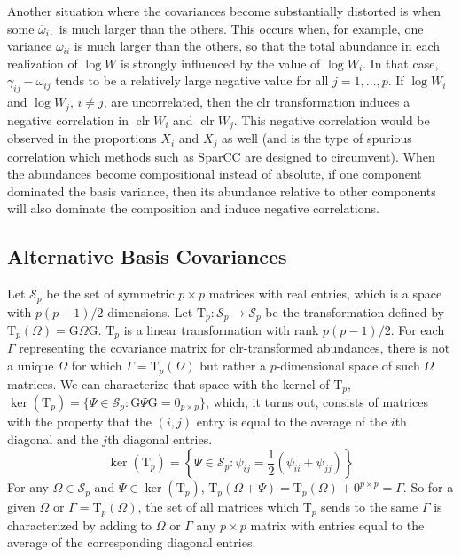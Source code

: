 \documentclass[10pt]{article}
\newcommand{\clr}{\operatorname{clr}}
\begin{document}
Another situation where the covariances become substantially distorted is when some $\overline{\omega}_{i\cdot}$ is much larger than the others. This occurs when, for example, one variance $\omega_{ii}$ is much larger than the others, so that the total abundance in each realization of $\log W$ is strongly influenced by the value of $\log W_i$. In that case, $\gamma_{ij} - \omega_{ij}$ tends to be a relatively large negative value for all $j = 1, \dots, p$. If $\log W_i$ and $\log W_j$, $i \ne j$, are uncorrelated, then the clr transformation induces a negative correlation in $\clr W_i$ and $\clr W_j$. This negative correlation would be observed in the proportions $X_i$ and $X_j$ as well (and is the type of spurious correlation which methods such as SparCC are designed to circumvent). When the abundances become compositional instead of absolute, if one component dominated the basis variance, then its abundance relative to other components will also dominate the composition and induce negative correlations.

\subsection*{Alternative Basis Covariances}

Let $\mathcal{S}_p$ be the set of symmetric $p \times p$ matrices with real entries, which is a space with $p(p+1)/2$ dimensions. Let $\mathrm{T}_p: \mathcal{S}_p \rightarrow \mathcal{S}_p$ be the transformation defined by $\mathrm{T}_p(\Omega) = \mathrm{G} \Omega \mathrm{G}$. $\mathrm{T}_p$ is a linear transformation with rank $p(p-1)/2$. For each $\Gamma$ representing the covariance matrix for clr-transformed abundances, there is not a unique $\Omega$ for which $\Gamma = \mathrm{T}_p(\Omega)$ but rather a $p$-dimensional space of such $\Omega$ matrices. We can characterize that space with the kernel of $\mathrm{T}_p$, $\ker(\mathrm{T}_p) = \{\Psi \in \mathcal{S}_p: \mathrm{G} \Psi \mathrm{G} = 0_{p \times p}\}$, which, it turns out, consists of matrices with the property that the $(i,j)$ entry is equal to the average of the $i$th diagonal and the $j$th diagonal entries.
\begin{equation}
\label{e:ker}
\ker(\mathrm{T}_p) = \left\{ \Psi \in \mathcal{S}_p: \psi_{ij} = \frac{1}{2}(\psi_{ii} + \psi_{jj})\right\}
\end{equation}
For any $\Omega \in \mathcal{S}_p$ and $\Psi \in \ker(\mathrm{T}_p)$, $\mathrm{T}_p(\Omega + \Psi) = \mathrm{T}_p(\Omega) + 0^{p \times p}  = \Gamma$. So for a given $\Omega$ or $\Gamma = \mathrm{T}_p(\Omega)$, the set of all matrices which $\mathrm{T}_p$ sends to the same $\Gamma$ is characterized by adding to $\Omega$ or $\Gamma$ any $p \times p$ matrix with entries equal to the average of the corresponding diagonal entries.
\end{document}
